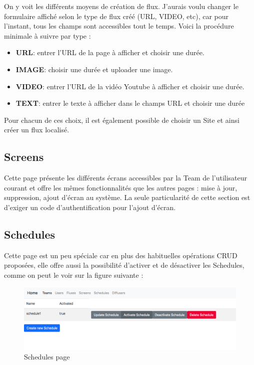 \documentclass[french]{article}
\begin{document}
On y voit les différents moyens de création de flux. J'aurais voulu changer le formulaire affiché selon le type de flux créé (URL, VIDEO, etc), car pour l'instant, tous les champs sont accessibles tout le temps. Voici la procédure minimale à suivre par type :
\begin{itemize}
	\item \textbf{URL}: entrer l'URL de la page à afficher et choisir une durée.
	\item \textbf{IMAGE}: choisir une durée et uploader une image.
	\item \textbf{VIDEO}: entrer l'URL de la vidéo Youtube à afficher et choisir une durée.
	\item \textbf{TEXT}: entrer le texte à afficher dans le champs URL et choisir une durée 
\end{itemize}
Pour chacun de ces choix, il est également possible de choisir un Site et ainsi créer un flux localisé.

\subsection{Screens}

Cette page présente les différents écrans accessibles par la Team de l'utilisateur courant et offre les mêmes fonctionnalités que les autres pages : mise à jour, suppression, ajout d'écran au système. La seule particularité de cette section est d'exiger un code d'authentification pour l'ajout d'écran.

\subsection{Schedules}

Cette page est un peu spéciale car en plus des habituelles opérations CRUD proposées, elle offre aussi la possibilité d'activer et de désactiver les Schedules, comme on peut le voir sur la figure suivante :

\begin{figure}[h]
	\centering	
	\includegraphics[width=0.8\linewidth]{interface/schedulepage.png}%
	\caption{Schedules page}
\end{figure} 
\end{document}
